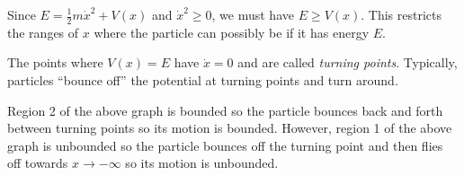\documentclass[../main.tex]{subfiles}
\begin{document}
Since $E = \frac{1}{2}m \dot{x}^2 + V(x)$ and $\dot{x}^2 \geq 0$, we must have $E \geq V(x)$.
This restricts the ranges of $x$ where the particle can possibly be if it has energy $E$.
\begin{center}
\end{center}
The points where $V(x) = E$ have $\dot{x} = 0$ and are called \textit{turning points}.
Typically, particles ``bounce off'' the potential at turning points and turn around.

Region 2 of the above graph is bounded so the particle bounces back and forth between turning points so its motion is bounded.
However, region 1 of the above graph is unbounded so the particle bounces off the turning point and then flies off towards $x \to -\infty$ so its motion is unbounded.
\end{document}
